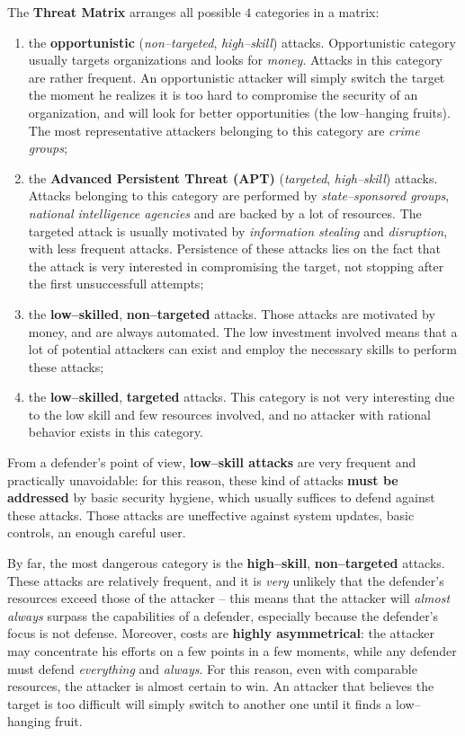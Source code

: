\documentclass[10pt]{extbook}
\begin{document}
The \textbf{Threat Matrix} arranges all possible $4$ categories in a matrix:
\begin{enumerate}
    \item the \textbf{opportunistic} (\emph{non--targeted}, \emph{high--skill})
        attacks. Opportunistic category usually targets organizations and looks
        for \emph{money}. Attacks in this category are rather frequent. An
        opportunistic attacker will simply switch the target the moment he
        realizes it is too hard to compromise the security of an organization,
        and will look for better opportunities (the low--hanging fruits). The
        most representative attackers belonging to this category are
        \emph{crime groups};
    \item the \textbf{Advanced Persistent Threat (APT)} (\emph{targeted},
        \emph{high--skill}) attacks. Attacks belonging to this category are
        performed by \emph{state--sponsored groups}, \emph{national
        intelligence agencies} and are backed by a lot of resources. The
        targeted attack is usually motivated by \emph{information stealing} and
        \emph{disruption}, with less frequent attacks. Persistence of these
        attacks lies on the fact that the attack is very interested in
        compromising the target, not stopping after the first unsuccessfull
        attempts;
    \item the \textbf{low--skilled}, \textbf{non--targeted} attacks. Those
        attacks are motivated by money, and are always automated. The low
        investment involved means that a lot of potential attackers can exist
        and employ the necessary skills to perform these attacks;
    \item the \textbf{low--skilled}, \textbf{targeted} attacks. This category
        is not very interesting due to the low skill and few resources
        involved, and no attacker with rational behavior exists in this
        category.
\end{enumerate}

From a defender's point of view, \textbf{low--skill attacks} are very frequent
and practically unavoidable: for this reason, these kind of attacks
\textbf{must be addressed} by basic security hygiene, which usually suffices to
defend against these attacks. Those attacks are uneffective against system
updates, basic controls, an enough careful user.

By far, the most dangerous category is the \textbf{high--skill},
\textbf{non--targeted} attacks. These attacks are relatively frequent, and it
is \emph{very} unlikely that the defender's resources exceed those of the
attacker -- this means that the attacker will \emph{almost always} surpass the
capabilities of a defender, especially because the defender's focus is not
defense. Moreover, costs are \textbf{highly asymmetrical}: the attacker
may concentrate his efforts on a few points in a few moments, while any
defender must defend \emph{everything} and \emph{always}. For this reason, even
with comparable resources, the attacker is almost certain to win. An attacker
that believes the target is too difficult will simply switch to another one
until it finds a low--hanging fruit.
\end{document}
